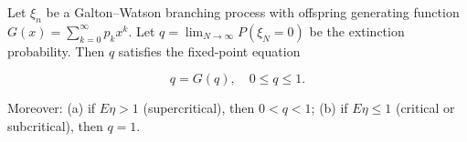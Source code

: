 Let $\xi_n$ be a Galton–Watson branching process with offspring generating function $G(x) = \sum_{k=0}^{\infty} p_k x^k$. Let $q = \lim_{N \to \infty} P(\xi_N = 0)$ be the extinction probability. Then $q$ satisfies the fixed-point equation

$$q = G(q), \quad 0 \leq q \leq 1.$$

Moreover:
(a) if $E\eta > 1$ (supercritical), then $0 < q < 1$;
(b) if $E\eta \leq 1$ (critical or subcritical), then $q = 1$.
